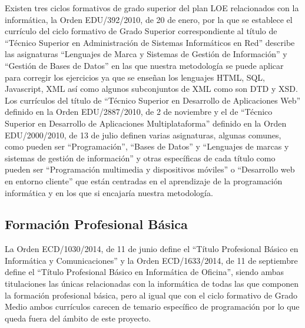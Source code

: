 Existen tres ciclos formativos de grado superior del plan LOE relacionados con la informática, la Orden EDU/392/2010, de 20 de enero, por la que se establece el currículo del ciclo formativo de Grado Superior correspondiente al título de ``Técnico Superior en Administración de Sistemas Informáticos en Red'' describe las asignaturas ``Lenguajes de Marca y Sistemas de Gestión de Información'' y ``Gestión de Bases de Datos'' en las que nuestra metodología se puede aplicar para corregir los ejercicios ya que se enseñan los lenguajes HTML, SQL, Javascript, XML así como algunos subconjuntos de XML como son DTD y XSD. Los currículos del título de ``Técnico Superior en Desarrollo de Aplicaciones Web'' definido en la Orden EDU/2887/2010, de 2 de noviembre y el de ``Técnico Superior en Desarrollo de Aplicaciones Multiplataforma'' definido en la Orden EDU/2000/2010, de 13 de julio definen varias asignaturas, algunas comunes, como pueden ser ``Programación'', ``Bases de Datos'' y ``Lenguajes de marcas y sistemas de gestión de información'' y otras específicas de cada título como pueden ser ``Programación multimedia y dispositivos móviles'' o ``Desarrollo web en entorno cliente'' que están centradas en el aprendizaje de la programación informática y en los que si encajaría nuestra metodología.

\subsection {Formación Profesional Básica}

La Orden ECD/1030/2014, de 11 de junio define el ``Título Profesional Básico en Informática y Comunicaciones'' y la Orden ECD/1633/2014, de 11 de septiembre define el  ``Título Profesional Básico en Informática de Oficina'', siendo ambas titulaciones las únicas relacionadas con la informática de todas las que componen la formación profesional básica, pero al igual que con el ciclo formativo de Grado Medio ambos currículos carecen de temario específico de programación por lo que queda fuera del ámbito de este proyecto.




